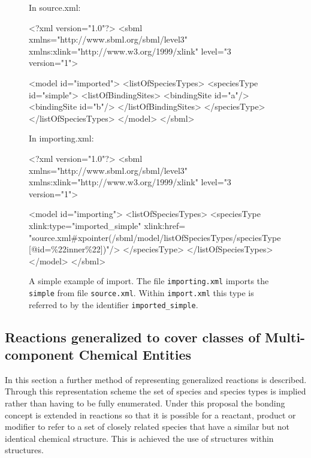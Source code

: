 \documentclass{cekarticle}
\begin{document}
\begin{figure}
In source.xml:
\begin{example}
<?xml version="1.0"?>
<sbml
    xmlns="http://www.sbml.org/sbml/level3"
    xmlns:xlink="http://www.w3.org/1999/xlink"
    level="3
    version="1">

    <model id="imported">
        <listOfSpeciesTypes>
            <speciesType id="simple">
                <listOfBindingSites>
                    <bindingSite id="a"/>
                    <bindingSite id="b"/>
                </listOfBindingSites>
            </speciesType>
        </listOfSpeciesTypes>
    </model>
</sbml>
\end{example}
In importing.xml:
\begin{example}
<?xml version="1.0"?>
<sbml
    xmlns="http://www.sbml.org/sbml/level3"
    xmlns:xlink="http://www.w3.org/1999/xlink"
    level="3
    version="1">

    <model id="importing">
        <listOfSpeciesTypes>
           <speciesType
               xlink:type="imported_simple"
               xlink:href=
"source.xml#xpointer(/sbml/model/listOfSpeciesTypes/speciesType[@id=\%22inner\%22])"/>
           </speciesType>
        </listOfSpeciesTypes>
    </model>
</sbml>
\end{example}
\caption{A simple example of  import. The file
\texttt{importing.xml} imports the 
\texttt{simple} from file \texttt{source.xml}.  Within
\texttt{import.xml} this type is referred to by the identifier
\texttt{imported\_simple}.}

\label{fig:import}
\end{figure}

\subsection{Reactions generalized to cover classes of Multi-component Chemical Entities}
\label{sec:generalizedreactions}

In this section a further method of representing generalized
reactions is described.  Through this representation scheme the
set of species and species types is implied rather than having to
be fully enumerated. Under this proposal the bonding concept is
extended in reactions so that it is possible for a reactant,
product or modifier to refer to a set of closely related species
that have a similar but not identical chemical structure. This is
achieved the use of  structures within
 structures.
\end{document}

